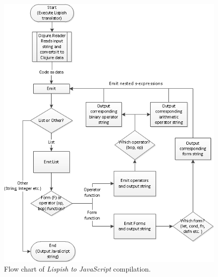 \begin{figure}[!htbp]
	\centering
	\includegraphics{Graphics/compilation_flow_chart.png}
	\caption[Flow chart of Lispish to JavaScript compilation.]
   {Flow chart of \textit{Lispish to JavaScript} compilation.}
  \label{fig:recursive_expansion_flowchart}
\end{figure}